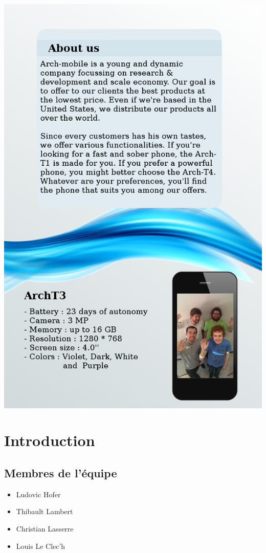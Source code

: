 \documentclass[a4paper, 12pt]{article}
\begin{document}
\begin{minipage}{.49\textwidth}
  \includegraphics[width=\linewidth]{flyerVerso}
\end{minipage}

\vskip 30mm

\pagebreak


\section{Introduction}
\subsection{Membres de l'équipe}
\begin{itemize}
\item Ludovic Hofer
\item Thibault Lambert
\item Christian Lasserre
\item Louis Le Clec'h
\end{itemize}
\end{document}
